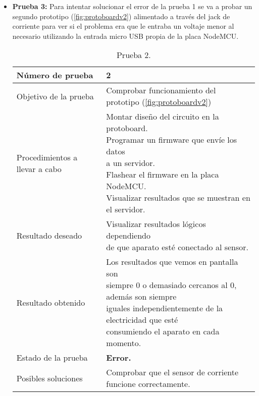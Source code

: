 \begin{itemize}
	\vspace{10cm}

	\item \textbf{Prueba 3:} Para intentar solucionar el error de la prueba 1 se va a probar un segundo prototipo (\ref{fig:protoboardv2}) alimentado a través del jack de corriente para ver si el problema era que le entraba un voltaje menor al necesario utilizando la entrada micro USB propia de la placa NodeMCU.



	\begin{table}[H]
		\begin{center}
			\begin{tabular}{|l|l|}
				\hline
				Número de prueba &  2 \\ \hline 
				Objetivo de la prueba &  Comprobar funcionamiento del prototipo (\ref{fig:protoboardv2})\\ \hline 
				Procedimientos a llevar a cabo &  \makecell[l]{\tabitem Montar diseño del circuito en la protoboard. \\ \tabitem Programar un firmware que envíe los datos \\ a un servidor.
					\\ \tabitem Flashear el firmware en la placa NodeMCU.
					\\ \tabitem Visualizar resultados que se muestran en el servidor.}
				\\ \hline 
				Resultado deseado &  \makecell[l]{Visualizar resultados lógicos dependiendo \\ de que aparato esté conectado al sensor.} \\ \hline 
				Resultado obtenido &  \makecell[l]{Los resultados que vemos en pantalla son \\ siempre 0 o demasiado cercanos al 0, además son siempre \\ iguales independientemente de la electricidad que esté \\ consumiendo el aparato en cada momento.} \\ \hline 
				Estado de la prueba &  \textbf{Error.} \\ \hline 
				Posibles soluciones &  \makecell[l]{Comprobar que el sensor de corriente \\ funcione correctamente. } \\ \hline 
				
			\end{tabular}
			\caption{Prueba 2.}
			\label{tabla:prueba2}
		\end{center}
	\end{table}


\end{itemize}
